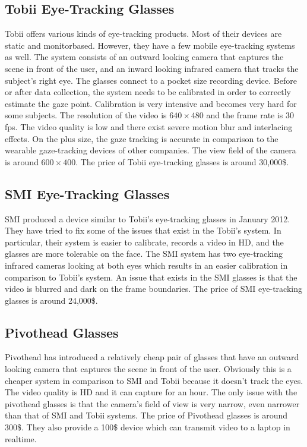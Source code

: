\subsection{Tobii Eye-Tracking Glasses}
Tobii offers various kinds of eye-tracking products. Most of their devices are static and monitorbased.
However, they have a few mobile eye-tracking systems as well. The system consists of an
outward looking camera that captures the scene in front of the user, and an inward looking infrared
camera that tracks the subject’s right eye. The glasses connect to a pocket size recording device.
Before or after data collection, the system needs to be calibrated in order to correctly estimate the
gaze point. Calibration is very intensive and becomes very hard for some subjects. The resolution
of the video is $640\times480$ and the frame rate is 30 fps. The video quality is low and there exist severe
motion blur and interlacing effects. On the plus size, the gaze tracking is accurate in comparison
to the wearable gaze-tracking devices of other companies. The view field of the camera is around
$600\times400$. The price of Tobii eye-tracking glasses is around 30,000\$.

\subsection{SMI Eye-Tracking Glasses}
SMI produced a device similar to Tobii’s eye-tracking glasses in January 2012. They have tried to fix some of the issues that exist in the Tobii’s system. In particular, their system is easier to calibrate, records a video in HD, and the glasses are more tolerable on the face. The SMI system has two eye-tracking infrared cameras looking at both eyes which results in an easier calibration in comparison to Tobii’s system. An issue that exists in the SMI glasses is that the video is blurred and dark on the frame boundaries. The price
of SMI eye-tracking glasses is around 24,000\$.

\subsection{Pivothead Glasses}
Pivothead has introduced a relatively cheap pair of glasses that have an outward looking camera
that captures the scene in front of the user. Obviously this is a cheaper system in comparison to
SMI and Tobii because it doesn’t track the eyes. The video quality is HD and it can capture for an
hour. The only issue with the pivothead glasses is that the camera’s field of view is very narrow,
even narrower than that of SMI and Tobii systems. The price of Pivothead glasses is around 300\$.
They also provide a 100\$ device which can transmit video to a laptop in realtime.

